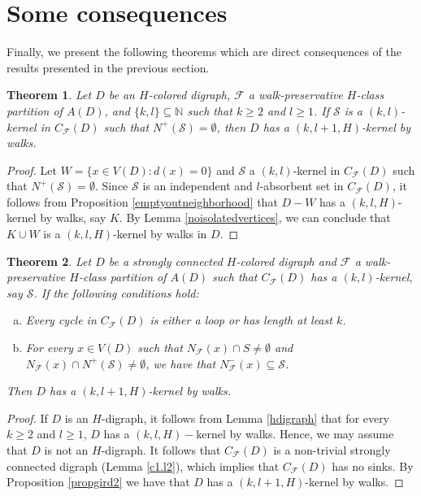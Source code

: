\documentclass[10pt,a4paper]{article}
\newtheorem{theorem}{Theorem}[section]
\begin{document}
\section{Some consequences}

Finally, we present the following theorems which are direct consequences of the results presented in the previous section. 

\begin{theorem}
Let $D$ be an $H$-colored digraph, $\mathscr{F}$ a walk-preservative $H$-class partition of $A(D)$, and $\{k, l \} \subseteq \mathbb{N}$ such that $k \geq 2$ and $l \geq 1$. If $\mathcal{S}$ is a $(k,l)$-kernel in $C_{\mathscr{F}}(D)$ such that $N^{+}(\mathcal{S}) = \emptyset$, then $D$ has a $(k,l+1,H)$-kernel by walks.
\end{theorem}
\begin{proof}
Let $W=\{ x \in V(D) : d(x)= 0 \}$ and $\mathcal{S}$ a $(k,l)$-kernel in $C_{\mathscr{F}}(D)$ such that $N^{+}(\mathcal{S}) = \emptyset$. Since $\mathcal{S}$ is an independent and $l$-absorbent set in $C_{\mathscr{F}}(D)$, it follows from Proposition \ref{emptyoutneighborhood} that $D-W$ has a $(k,l,H)$-kernel by walks, say $K$. By Lemma \ref{noisolatedvertices}, we can conclude that $K \cup W$ is a $(k,l,H)$-kernel by walks in $D$.
\end{proof}

\begin{theorem}  
\label{propgird}
Let $D$ be a strongly connected $H$-colored digraph and $\mathscr{F}$ a walk-preservative $H$-class partition of $A(D)$ such that $C_{\mathscr{F}}(D)$ has a $(k,l)$-kernel, say $\mathcal{S}$. If the following conditions hold:
	\begin{enumerate}[a)]
	\item Every cycle in $C_{\mathscr{F}}(D)$ is either a loop or has length at least $k$.
	
	\item For every $x \in V(D)$ such that $N_{\mathscr{F}}(x) \cap S \neq \emptyset $ and $N_{\mathscr{F}}(x) \cap N^{+}(\mathcal{S}) \neq \emptyset$, we have that $N^{-}_{\mathscr{F}}(x) \subseteq \mathcal{S}$.
	\end{enumerate}
Then $D$ has a $(k,l+1,H)$-kernel by walks.
\end{theorem}
\begin{proof}
If $D$ is an $H$-digraph, it follows from Lemma \ref{hdigraph} that  for every $k \geq 2$ and $l \geq 1$, $D$ has a $(k,l,H)-$kernel by walks. Hence, we may assume that $D$ is not an $H$-digraph. It follows that $C_{\mathscr{F}}(D)$ is a non-trivial strongly connected digraph (Lemma \ref{c1.l2}), which implies that $C_{\mathscr{F}}(D)$ has no sinks. By Proposition \ref{propgird2} we have that $D$ has a $(k, l+1,H)$-kernel by walks.
\end{proof}
\end{document}
